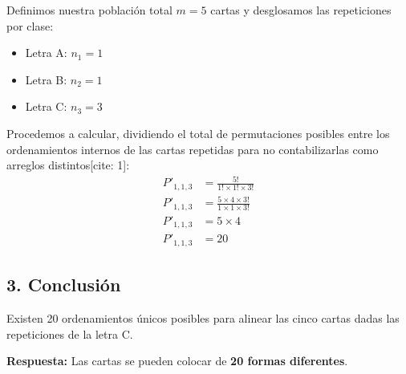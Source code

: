 \documentclass[12pt, a4paper]{article}
\begin{document}
Definimos nuestra población total $m = 5$ cartas y desglosamos las repeticiones por clase:
\begin{itemize}
    \item Letra A: $n_1 = 1$
    \item Letra B: $n_2 = 1$
    \item Letra C: $n_3 = 3$
\end{itemize}

Procedemos a calcular, dividiendo el total de permutaciones posibles entre los ordenamientos internos de las cartas repetidas para no contabilizarlas como arreglos distintos[cite: 1]:
\begin{align*}
P'_{1,1,3} &= \frac{5!}{1! \times 1! \times 3!} \\
P'_{1,1,3} &= \frac{5 \times 4 \times 3!}{1 \times 1 \times 3!} \\
P'_{1,1,3} &= 5 \times 4 \\
P'_{1,1,3} &= 20
\end{align*}

\subsection*{3. Conclusión}
Existen 20 ordenamientos únicos posibles para alinear las cinco cartas dadas las repeticiones de la letra C.

\vspace{0.5cm}

\textbf{Respuesta:} Las cartas se pueden colocar de \textbf{20 formas diferentes}.
\end{document}
